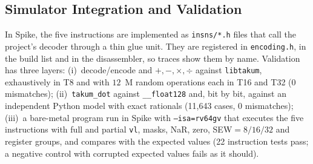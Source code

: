\subsection{Simulator Integration and Validation}
In Spike, the five instructions are implemented as \texttt{insns/*.h} files that call the project's decoder
through a thin glue unit. They are registered in \texttt{encoding.h}, in the build list and in the
disassembler, so traces show them by name. Validation has three layers:
(i)~decode/encode and $+,-,\times,\div$ against \texttt{libtakum}, exhaustively in T8 and with $12$~M random operations each in T16 and T32 (0 mismatches);
(ii)~\texttt{takum\_dot} against \texttt{\_\_float128} and, bit by bit, against an independent Python model with exact rationals (11{,}643 cases, 0 mismatches);
(iii)~a bare-metal program run in Spike with \texttt{--isa=rv64gv} that executes the five instructions with full and partial \texttt{vl}, masks, NaR, zero,
SEW$=8/16/32$ and register groups, and compares with the expected values (22 instruction tests pass; a negative control with corrupted
expected values fails as it should).
